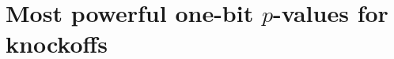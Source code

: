 \documentclass[12pt]{article}
\theoremstyle{definition}
\theoremstyle{remark}
\newcommand{\srz}{Z}
\newcommand{\sry}{Y}
\begin{document}
%
%
%


\section{Most powerful one-bit $p$-values for knockoffs}
\label{sec:knockoffs}
\end{document}
